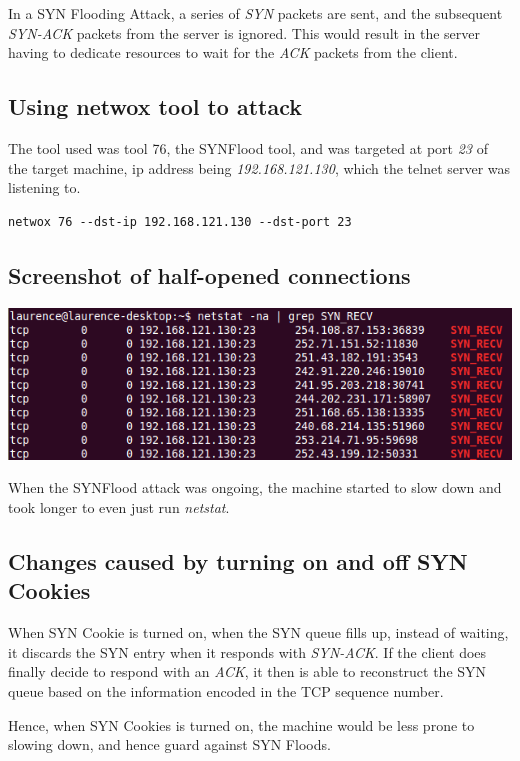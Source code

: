 \documentclass[12pt]{article}
\begin{document}
In a SYN Flooding Attack, a series of \emph{SYN} packets are sent, and the subsequent \emph{SYN-ACK} packets from the server is ignored. This would result in the server having to dedicate resources to wait for the \emph{ACK} packets from the client.\\

\subsection{Using netwox tool to attack}
The tool used was tool 76, the SYNFlood tool, and was targeted at port \emph{23} of the target machine, ip address being \emph{192.168.121.130}, which the telnet server was listening to.\\

\begin{lstlisting}
netwox 76 --dst-ip 192.168.121.130 --dst-port 23
\end{lstlisting}

\subsection{Screenshot of half-opened connections}
\includegraphics[width=160mm]{task21.png}

When the SYNFlood attack was ongoing, the machine started to slow down and took longer to even just run \emph{netstat}.\\

\subsection{Changes caused by turning on and off SYN Cookies}
When SYN Cookie is turned on, when the SYN queue fills up, instead of waiting, it discards the SYN entry when it responds with \emph{SYN-ACK}. If the client does finally decide to respond with an \emph{ACK}, it then is able to reconstruct the SYN queue based on the information encoded in the TCP sequence number.

Hence, when SYN Cookies is turned on, the machine would be less prone to slowing down, and hence guard against SYN Floods.
\pagebreak
\end{document}
